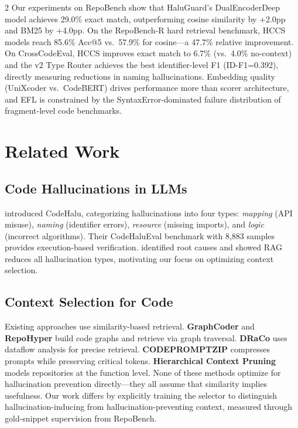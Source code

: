 \documentclass[11pt,a4paper]{article}
\begin{document}
\begin{multicols}{2}
Our experiments on RepoBench show that HaluGuard's DualEncoderDeep model achieves 29.0\% exact match, outperforming cosine similarity by +2.0pp and BM25 by +4.0pp. On the RepoBench-R hard retrieval benchmark, HCCS models reach 85.6\% Acc@5 vs.\ 57.9\% for cosine---a 47.7\% relative improvement. On CrossCodeEval, HCCS improves exact match to 6.7\% (vs.\ 4.0\% no-context) and the v2 Type Router achieves the best identifier-level F1 (ID-F1=0.392), directly measuring reductions in naming hallucinations. Embedding quality (UniXcoder vs.\ CodeBERT) drives performance more than scorer architecture, and EFL is constrained by the SyntaxError-dominated failure distribution of fragment-level code benchmarks.

\section{Related Work}

\subsection{Code Hallucinations in LLMs}

\citet{tian2025codehalu} introduced CodeHalu, categorizing hallucinations into four types: \textit{mapping} (API misuse), \textit{naming} (identifier errors), \textit{resource} (missing imports), and \textit{logic} (incorrect algorithms). Their CodeHaluEval benchmark with 8,883 samples provides execution-based verification. \citet{zhang2025llmhallucinations} identified root causes and showed RAG reduces all hallucination types, motivating our focus on optimizing context selection.

\subsection{Context Selection for Code}

Existing approaches use similarity-based retrieval. \textbf{GraphCoder} \citep{liu2024graphcoder} and \textbf{RepoHyper} \citep{phan2024repohyper} build code graphs and retrieve via graph traversal. \textbf{DRaCo} \citep{cheng2024draco} uses dataflow analysis for precise retrieval. \textbf{CODEPROMPTZIP} \citep{he2025codepromptzip} compresses prompts while preserving critical tokens. \textbf{Hierarchical Context Pruning} \citep{zhang2024hcp} models repositories at the function level. None of these methods optimize for hallucination prevention directly---they all assume that similarity implies usefulness. Our work differs by explicitly training the selector to distinguish hallucination-inducing from hallucination-preventing context, measured through gold-snippet supervision from RepoBench.


\end{multicols}
\end{document}
